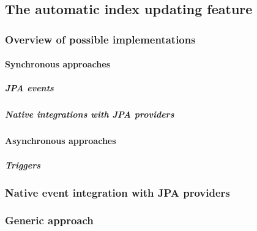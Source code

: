 \subsection{The automatic index updating feature}

\subsubsection{Overview of possible implementations}

\paragraph{Synchronous approaches}

\subparagraph{JPA events}

\subparagraph{Native integrations with JPA providers}

\paragraph{Asynchronous approaches}

\subparagraph{Triggers}

\subsubsection{Native event integration with JPA providers}

\subsubsection{Generic approach}

\pagebreak